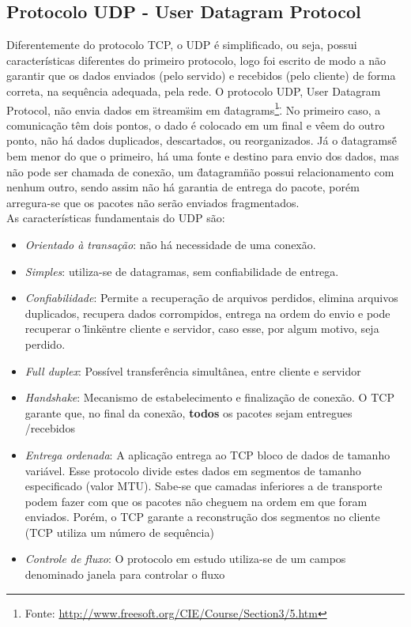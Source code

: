 \documentclass[a4paper,10pt]{article}
\begin{document}
\subsection{Protocolo UDP - User Datagram Protocol}
Diferentemente do protocolo TCP, o UDP é simplificado, ou seja, possui características diferentes do primeiro protocolo, logo foi escrito de modo a não garantir que os dados enviados (pelo
servido) e recebidos (pelo cliente) de forma correta, na sequência 
adequada, pela rede.
O protocolo UDP, User Datagram Protocol, não envia dados em \"stream\" sim em \"datagrams\footnote{Fonte: \url{http://www.freesoft.org/CIE/Course/Section3/5.htm} }\". No primeiro caso, a comunicação têm dois pontos, o dado é colocado em um final e vêem do outro ponto, não há dados duplicados, descartados, ou reorganizados. Já o \"datagrams\" é bem menor do que o primeiro, há uma fonte e destino para envio dos dados, mas não pode ser chamada de conexão, um \"datagram\" não possui relacionamento com nenhum outro, sendo assim não há garantia de entrega do pacote, porém arregura-se que os pacotes não serão enviados fragmentados. 
\\As características fundamentais do UDP são:
\begin{itemize}
\item \emph{Orientado à transação}: não há necessidade de uma conexão.
\item \emph{Simples}: utiliza-se de datagramas, sem confiabilidade de entrega.
\item \emph{Confiabilidade}: Permite a recuperação de arquivos perdidos, elimina 
arquivos duplicados, recupera dados corrompidos, entrega na ordem do envio e 
pode recuperar o \"link\" entre cliente e servidor, caso esse, por algum motivo,
seja perdido.
\item \emph{Full duplex}: Possível transferência simultânea, entre cliente e 
servidor
\item \emph{Handshake}: Mecanismo de estabelecimento e finalização de conexão.
O TCP garante que, no final da conexão, \textbf{todos} os pacotes sejam entregues
/recebidos
\item \emph{Entrega ordenada}: A aplicação entrega ao TCP bloco de dados de 
tamanho variável. Esse protocolo divide estes dados em segmentos de tamanho 
especificado (valor MTU). Sabe-se que camadas inferiores a de transporte podem 
fazer com que os pacotes não cheguem na ordem em que foram enviados. Porém, o TCP
garante a reconstrução dos segmentos no cliente (TCP utiliza um número de 
sequência)
\item \emph{Controle de fluxo}: O protocolo em estudo utiliza-se de um campos 
denominado janela para controlar o fluxo
\end{itemize}
\end{document}
